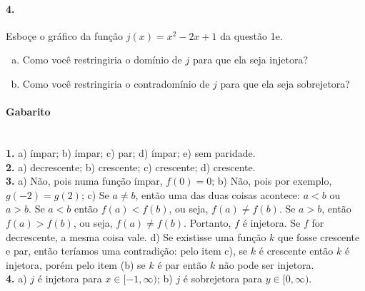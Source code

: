 \documentclass[a4paper,12pt]{article}
\begin{document}
\begin{multicols}{2}
\paragraph*{4.} Esboçe o gráfico da função $j(x) = x^2 - 2x + 1$ da questão 1e.
\begin{enumerate}[a)]
    \item Como você restringiria o domínio de $j$ para que ela seja injetora?
    \item Como você restringiria o contradomínio de $j$ para que ela seja sobrejetora?
\end{enumerate}
 \vspace*{4cm}
\end{multicols}

\vspace*{\fill}
{\footnotesize
\paragraph*{Gabarito} \hspace*{\fill}\\
\textbf{1.} a) ímpar; b) ímpar; c) par; d) ímpar; e) sem paridade.\\   
\textbf{2.} a) decrescente; b) crescente; c) crescente; d) crescente.\\
\textbf{3.} a) Não, pois numa função ímpar, $f(0) = 0$; b)  Não, pois por exemplo, $g(-2) = g(2)$; c) Se $a\neq b$, então uma das duas coisas acontece: $a <b$ ou $a > b$. Se $a<b$ então $f(a) < f(b)$, ou seja, $f(a) \neq f(b)$. Se $a > b$, então $f(a) > f(b)$, ou seja, $f(a) \neq f(b)$. Portanto, $f$ é injetora. Se $f$ for decrescente, a mesma coisa vale. d)  Se existisse uma função $k$ que fosse crescente e par, então teríamos uma contradição: pelo item 
c), se $k$ é crescente então $k$ é injetora, porém pelo item (b) se $k$ é par então $k$ não pode ser injetora.\\
\textbf{4.} a) $j$ é injetora para $x \in [-1, \infty)$; b) $j$ é sobrejetora para $y \in [0, \infty)$.
}
\end{document}
